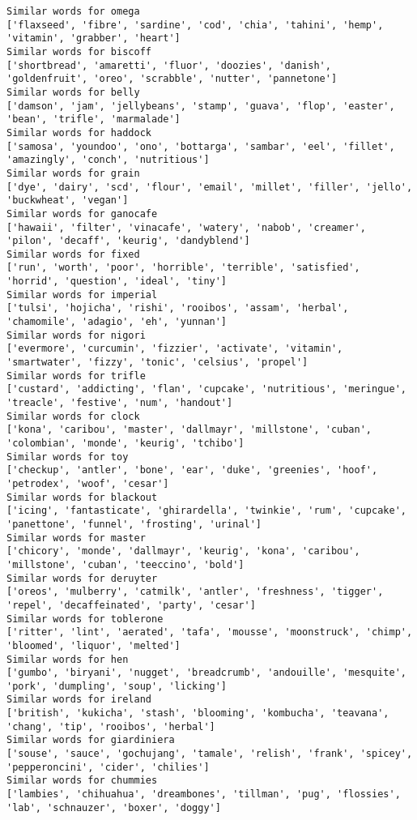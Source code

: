 \documentclass[11pt]{article}
\begin{document}
\begin{Verbatim}[commandchars=\\\{\}]
Similar words for omega
['flaxseed', 'fibre', 'sardine', 'cod', 'chia', 'tahini', 'hemp', 'vitamin', 'grabber', 'heart']
Similar words for biscoff
['shortbread', 'amaretti', 'fluor', 'doozies', 'danish', 'goldenfruit', 'oreo', 'scrabble', 'nutter', 'pannetone']
Similar words for belly
['damson', 'jam', 'jellybeans', 'stamp', 'guava', 'flop', 'easter', 'bean', 'trifle', 'marmalade']
Similar words for haddock
['samosa', 'youndoo', 'ono', 'bottarga', 'sambar', 'eel', 'fillet', 'amazingly', 'conch', 'nutritious']
Similar words for grain
['dye', 'dairy', 'scd', 'flour', 'email', 'millet', 'filler', 'jello', 'buckwheat', 'vegan']
Similar words for ganocafe
['hawaii', 'filter', 'vinacafe', 'watery', 'nabob', 'creamer', 'pilon', 'decaff', 'keurig', 'dandyblend']
Similar words for fixed
['run', 'worth', 'poor', 'horrible', 'terrible', 'satisfied', 'horrid', 'question', 'ideal', 'tiny']
Similar words for imperial
['tulsi', 'hojicha', 'rishi', 'rooibos', 'assam', 'herbal', 'chamomile', 'adagio', 'eh', 'yunnan']
Similar words for nigori
['evermore', 'curcumin', 'fizzier', 'activate', 'vitamin', 'smartwater', 'fizzy', 'tonic', 'celsius', 'propel']
Similar words for trifle
['custard', 'addicting', 'flan', 'cupcake', 'nutritious', 'meringue', 'treacle', 'festive', 'num', 'handout']
Similar words for clock
['kona', 'caribou', 'master', 'dallmayr', 'millstone', 'cuban', 'colombian', 'monde', 'keurig', 'tchibo']
Similar words for toy
['checkup', 'antler', 'bone', 'ear', 'duke', 'greenies', 'hoof', 'petrodex', 'woof', 'cesar']
Similar words for blackout
['icing', 'fantasticate', 'ghirardella', 'twinkie', 'rum', 'cupcake', 'panettone', 'funnel', 'frosting', 'urinal']
Similar words for master
['chicory', 'monde', 'dallmayr', 'keurig', 'kona', 'caribou', 'millstone', 'cuban', 'teeccino', 'bold']
Similar words for deruyter
['oreos', 'mulberry', 'catmilk', 'antler', 'freshness', 'tigger', 'repel', 'decaffeinated', 'party', 'cesar']
Similar words for toblerone
['ritter', 'lint', 'aerated', 'tafa', 'mousse', 'moonstruck', 'chimp', 'bloomed', 'liquor', 'melted']
Similar words for hen
['gumbo', 'biryani', 'nugget', 'breadcrumb', 'andouille', 'mesquite', 'pork', 'dumpling', 'soup', 'licking']
Similar words for ireland
['british', 'kukicha', 'stash', 'blooming', 'kombucha', 'teavana', 'chang', 'tip', 'rooibos', 'herbal']
Similar words for giardiniera
['souse', 'sauce', 'gochujang', 'tamale', 'relish', 'frank', 'spicey', 'pepperoncini', 'cider', 'chilies']
Similar words for chummies
['lambies', 'chihuahua', 'dreambones', 'tillman', 'pug', 'flossies', 'lab', 'schnauzer', 'boxer', 'doggy']

\end{Verbatim}
\end{document}
